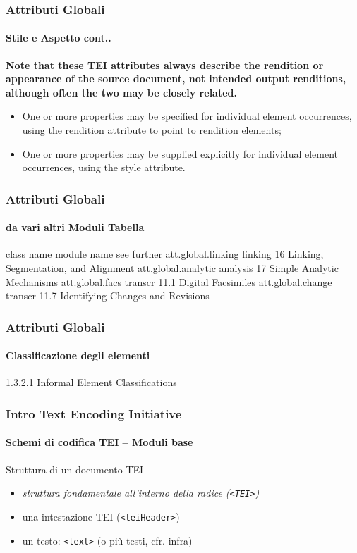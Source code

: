 \begin{frame}
    \frametitle{Attributi Globali}
    \framesubtitle{Stile e Aspetto cont..}
    \addtocounter{nframe}{1}
    
    \textbf{Note that these TEI attributes always describe the rendition or appearance of the source document, not intended output renditions, although often the two may be closely related.}

    \begin{itemize}
        \item One or more properties may be specified for individual element occurrences, using the rendition attribute to point to rendition elements;
        \item One or more properties may be supplied explicitly for individual element occurrences, using the style attribute.
    \end{itemize}

\end{frame}



\begin{frame}
    \frametitle{Attributi Globali}
    \framesubtitle{da vari altri Moduli Tabella}
    \addtocounter{nframe}{1}
class name	module name	see further
att.global.linking	linking	16 Linking, Segmentation, and Alignment
att.global.analytic	analysis	17 Simple Analytic Mechanisms
att.global.facs	transcr	11.1 Digital Facsimiles
att.global.change	transcr	11.7 Identifying Changes and Revisions

\end{frame}


% 
\begin{frame}
    \frametitle{Attributi Globali}
    \framesubtitle{Classificazione degli elementi}
    \addtocounter{nframe}{1}
    1.3.2.1 Informal Element Classifications

\end{frame}


\begin{frame}
	\frametitle{Intro Text Encoding Initiative}
	\framesubtitle{Schemi di codifica TEI – Moduli base}
	\addtocounter{nframe}{1}

	\begin{block}{Struttura di un documento TEI}
        \begin{itemize}
            \item \textit{struttura fondamentale all’interno della radice (\texttt{<TEI>})}
            \item una intestazione TEI (\texttt{<teiHeader>})
            \item un testo: \texttt{<text>} (o più testi, cfr. infra)
        \end{itemize}
    \end{block}
    
\end{frame}